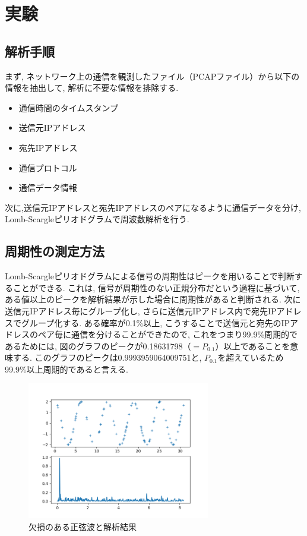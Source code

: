 \documentclass[twocolumn,10pt]{ltjsarticle}
\begin{document}
\section{実験}
\subsection{解析手順}
まず, ネットワーク上の通信を観測したファイル（PCAPファイル）から以下の情報を抽出して,
解析に不要な情報を排除する. 

\begin{itemize}
    \item 通信時間のタイムスタンプ
    \item 送信元IPアドレス
    \item 宛先IPアドレス
    \item 通信プロトコル
    \item 通信データ情報
\end{itemize}

次に,送信元IPアドレスと宛先IPアドレスのペアになるように通信データを分け, 
Lomb-Scargleピリオドグラムで周波数解析を行う. 

\subsection{周期性の測定方法}
Lomb-Scargleピリオドグラムによる信号の周期性はピークを用いることで判断することができる. 
これは, 信号が周期性のない正規分布だという過程に基づいて, 
ある値以上のピークを解析結果が示した場合に周期性があると判断される. 
次に送信元IPアドレス毎にグループ化し, さらに送信元IPアドレス内で宛先IPアドレスでグループ化する. ある確率が0.1\%以上, 
こうすることで送信元と宛先のIPアドレスのペア毎に通信を分けることができたので, 
これをつまり99.9\%周期的であるためには, 図のグラフのピークが0.18631798（${=P_{0.1}}$）以上であることを意味する. 
このグラフのピークは0.9993959064009751と, ${P_{0.1}}$を超えているため99.9\%以上周期的であると言える. 

\begin{figure}[htbp]
    \centering
    \includegraphics[width=8cm]{images/【実験】LombScargleピリオドグラムによるBOS2016の解析/lombscargle.png}
    \caption{欠損のある正弦波と解析結果}
    \label{fig:lombscargle}
\end{figure}
\end{document}
